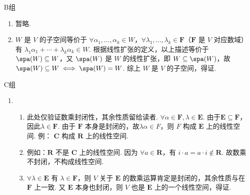 \centerline{\heiti B组}
\begin{enumerate}
    \item 暂略.

    \item $W$ 是 $V$ 的子空间等价于 $\forall \alpha_1,\ldots,\alpha_k\in W$，$\forall \lambda_1,\ldots,\lambda_k\in \mathbf{F}$（$\mathbf{F}$ 是 $V$ 对应数域）有 $\lambda_1\alpha_1+\cdots+\lambda_k\alpha_k\in W$. 根据线性扩张的定义，以上描述等价于 $\spa(W)\subseteq W$，又 $\spa(W)$ 是 $W$ 的线性扩张，即 $W\subseteq\spa(W)$，故$\spa(W)\subseteq W \iff \spa(W)=W$. 综上 $W$ 是 $V$ 的子空间，得证.
\end{enumerate}

\centerline{\heiti C组}
\begin{enumerate}
    \item \begin{enumerate}
              \item 此处仅验证数乘封闭性，其余性质留给读者. $\forall \alpha\in \mathbf{F},\lambda\in \mathbf{E}$. 由于$\mathbf{E}\subseteq \mathbf{F}$，因此$\lambda\in \mathbf{F}$. 由于 $\mathbf{F}$ 本身是封闭的，故$\lambda\alpha\in F$，则 $F$ 构成 $\mathbf{E}$ 上的线性空间. 例： $\mathbf{C}$ 构成 $\mathbf{R}$ 上的线性空间.

              \item 例如：$\mathbf{R}$ 不是 $\mathbf{C}$ 上的线性空间. 因为 $\forall a\in\mathbf{R}$，有 $i\cdot a=a\cdot i\not\in\mathbf{R}$. 故数乘不封闭，不构成线性空间.

              \item $\forall\lambda\in \mathbf{E}$ 有 $\lambda\in \mathbf{F}$，则 $V$ 关于 $\mathbf{E}$ 的数乘运算肯定是封闭的，其余性质与在 $\mathbf{F}$ 上一致. 又 $\mathbf{E}$ 本身也封闭，则 $V$ 也是 $\mathbf{E}$ 上的一个线性空间，得证.
          \end{enumerate}
\end{enumerate}

\clearpage
